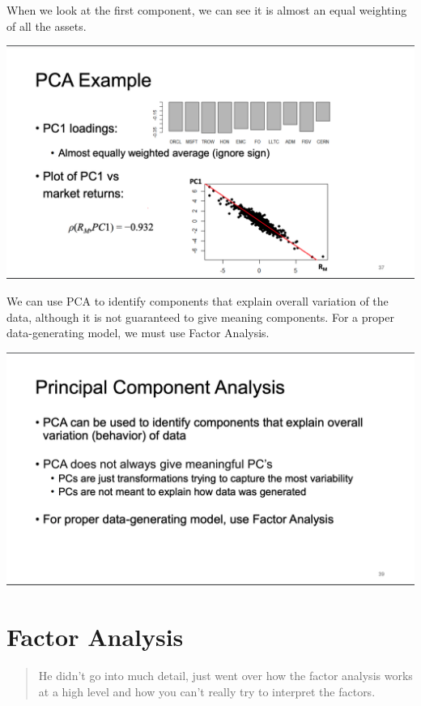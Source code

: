 \documentclass[
  oneside]{book}
\begin{document}
When we look at the first component, we can see it is almost an equal weighting of all the assets.

\includegraphics{Notes/Obsidian-Attachments/6-Factor-Models.png}

We can use PCA to identify components that explain overall variation of the data, although it is not guaranteed to give meaning components. For a proper data-generating model, we must use Factor Analysis.

\includegraphics{Notes/Obsidian-Attachments/6-Factor-Models-1.png}

\hypertarget{factor-analysis}{%
\section{Factor Analysis}\label{factor-analysis}}

\begin{quote}
He didn't go into much detail, just went over how the factor analysis works at a high level and how you can't really try to interpret the factors.
\end{quote}
\end{document}
